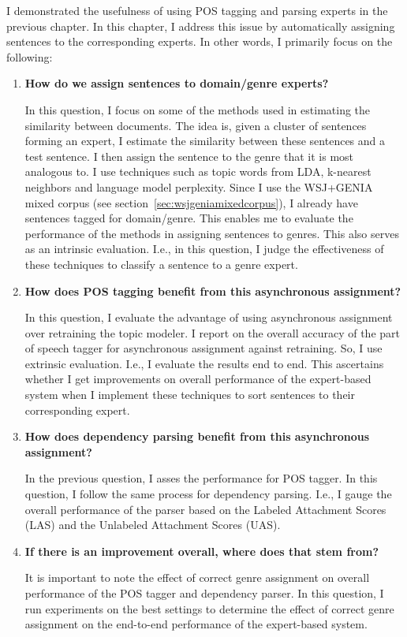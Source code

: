 I demonstrated the usefulness of using POS tagging and parsing experts in the previous chapter. %
In this chapter, I address this issue by automatically assigning sentences to the corresponding experts. In other words, I primarily focus on the following:
\begin{enumerate} [label=\textbf{Question \arabic*:},align=left, leftmargin=!]

    \item \textbf{How do we assign sentences to domain/genre experts?}
    
    In this question, I focus on some of the methods used in estimating the similarity between documents. The idea is, given a cluster of sentences forming an expert, I estimate the similarity between these sentences and a test sentence. I then assign the sentence to the genre that it is most analogous to. I use techniques such as topic words from LDA, k-nearest neighbors and language model perplexity. Since I use the WSJ+GENIA mixed corpus (see section~\ref{sec:wsjgeniamixedcorpus}), I already have sentences tagged for domain/genre. This enables me to evaluate the performance of the methods in assigning sentences to genres. This also serves as an intrinsic evaluation. I.e., in this question, I judge the effectiveness of these techniques to classify a sentence to a genre expert.
    
    \item \textbf{How does POS tagging benefit from this asynchronous assignment?}
    
    In this question, I evaluate the advantage of using asynchronous assignment over retraining the topic modeler. I report on the overall accuracy of the part of speech tagger for asynchronous assignment against retraining. So, I use extrinsic evaluation. I.e., I evaluate the results end to end. This ascertains whether I get improvements on overall performance of the expert-based system when I implement these techniques to sort sentences to their corresponding expert.
    
    \item \textbf{How does dependency parsing benefit from this asynchronous assignment?}
    
    In the previous question, I asses the performance for POS tagger. In this question, I follow the same process for dependency parsing. I.e., I gauge the overall performance of the parser based on the Labeled Attachment Scores (LAS) and the Unlabeled Attachment Scores (UAS).
    
    \item \textbf{If there is an improvement overall, where does that stem from?}
    
    It is important to note the effect of correct genre assignment on overall performance of the POS tagger and dependency parser. In this question, I run experiments on the best settings to determine the effect of correct genre assignment on the end-to-end performance of the expert-based system. 



\end{enumerate}




